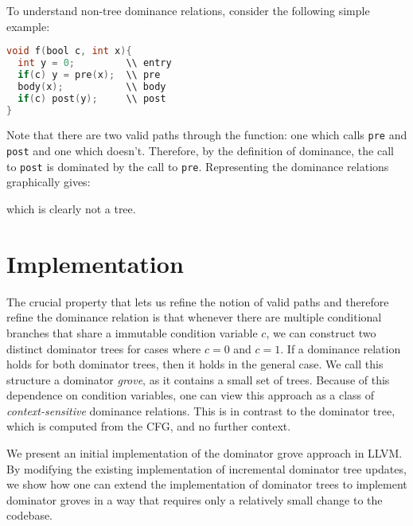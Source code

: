 \documentclass[a4paper,twocolumn]{article}
\begin{document}
To understand non-tree dominance relations, consider the following simple
example: 
\begin{minipage}{\linewidth}
\begin{lstlisting}[language=C]
void f(bool c, int x){
  int y = 0;         \\ entry
  if(c) y = pre(x);  \\ pre
  body(x);           \\ body	
  if(c) post(y);     \\ post
}
\end{lstlisting}
\end{minipage}
Note that there are two valid paths through the function: one which calls
\texttt{pre} and \texttt{post} and one which doesn't. Therefore, by the
definition of dominance, the call to \texttt{post} is dominated by the call to
\texttt{pre}. Representing the dominance relations graphically gives: 
\begin{center}
\end{center} 
which is clearly not a tree.

\section*{Implementation}
The crucial property that lets us refine the notion of valid paths and
therefore refine the dominance relation is that whenever there are multiple
conditional branches that share a immutable condition variable $c$, we can construct
two distinct dominator trees for cases where $c=0$ and $c=1$. If a dominance
relation holds for both dominator trees, then it holds in the general case. We
call this structure a dominator \emph{grove}, as it contains a small set of
trees. Because of this dependence on condition variables, one can view this
approach as a class of \emph{context-sensitive} dominance relations. This is in
contrast to the dominator tree, which is computed from the CFG, and no further
context.

We present an initial implementation of the dominator grove approach in LLVM.
By modifying the existing implementation of incremental dominator tree updates,
we show how one can extend the implementation of dominator trees to implement
dominator groves in a way that requires only a relatively small change to the
codebase. 
\end{document}
